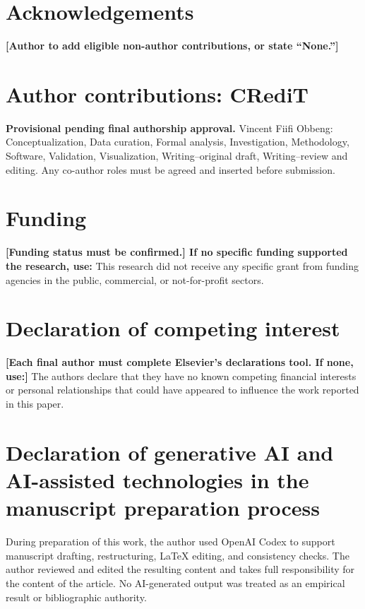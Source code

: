 \section*{Acknowledgements}

\textbf{[Author to add eligible non-author contributions, or state ``None.'']}

\section*{Author contributions: CRediT}

\textbf{Provisional pending final authorship approval.} Vincent Fiifi Obbeng: Conceptualization, Data curation, Formal analysis, Investigation, Methodology, Software, Validation, Visualization, Writing--original draft, Writing--review and editing. Any co-author roles must be agreed and inserted before submission.

\section*{Funding}

\textbf{[Funding status must be confirmed.] If no specific funding supported the research, use:} This research did not receive any specific grant from funding agencies in the public, commercial, or not-for-profit sectors.

\section*{Declaration of competing interest}

\textbf{[Each final author must complete Elsevier's declarations tool. If none, use:]} The authors declare that they have no known competing financial interests or personal relationships that could have appeared to influence the work reported in this paper.

\section*{Declaration of generative AI and AI-assisted technologies in the manuscript preparation process}

During preparation of this work, the author used OpenAI Codex to support manuscript drafting, restructuring, LaTeX editing, and consistency checks. The author reviewed and edited the resulting content and takes full responsibility for the content of the article. No AI-generated output was treated as an empirical result or bibliographic authority.

